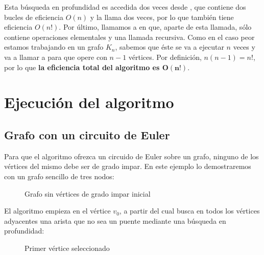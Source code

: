 Esta búsqueda en profundidad es accedida dos veces desde , que contiene dos bucles  de eficiencia $O(n)$ y la llama dos veces, por lo que  también tiene eficiencia $O(n!)$.
Por último, llamamos a  en  que, aparte de esta llamada, sólo contiene operaciones elementales y una llamada recursiva.
Como en el caso peor estamos trabajando en un grafo $K_n$, sabemos que éste se va a ejecutar $n$ veces y va a llamar a  para que opere con $n-1$ vértices.
Por definición, $n(n-1)=n!$, por lo que \textbf{la eficiencia total del algoritmo es $\boldsymbol{O(n!)}$}.

\section{Ejecución del algoritmo}\label{voraces-ejecucion}

\subsection{Grafo con un circuito de Euler}\label{voraces-ejecucion-circuito}

Para que el algoritmo ofrezca un circuido de Euler sobre un grafo, ninguno de los vértices del mismo debe ser de grado impar.
En este ejemplo lo demostraremos con un grafo sencillo de tres nodos:

\begin{figure}[h]
\begin{center}
\end{center}
\caption{Grafo sin vértices de grado impar inicial}
\end{figure}

El algoritmo empieza en el vértice $v_0$, a partir del cual busca en todos los vértices adyacentes una arista que no sea un puente mediante una búsqueda en profundidad:

\begin{figure}[h]
\begin{center}
\end{center}
\caption{Primer vértice seleccionado}
\end{figure}

